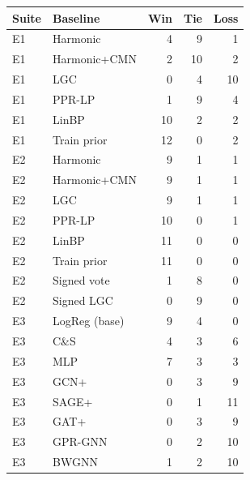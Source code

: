 \begin{tabular}{llrrr}
\toprule
Suite & Baseline & Win & Tie & Loss \\
\midrule
E1 & Harmonic & 4 & 9 & 1 \\
E1 & Harmonic+CMN & 2 & 10 & 2 \\
E1 & LGC & 0 & 4 & 10 \\
E1 & PPR-LP & 1 & 9 & 4 \\
E1 & LinBP & 10 & 2 & 2 \\
E1 & Train prior & 12 & 0 & 2 \\
E2 & Harmonic & 9 & 1 & 1 \\
E2 & Harmonic+CMN & 9 & 1 & 1 \\
E2 & LGC & 9 & 1 & 1 \\
E2 & PPR-LP & 10 & 0 & 1 \\
E2 & LinBP & 11 & 0 & 0 \\
E2 & Train prior & 11 & 0 & 0 \\
E2 & Signed vote & 1 & 8 & 0 \\
E2 & Signed LGC & 0 & 9 & 0 \\
E3 & LogReg (base) & 9 & 4 & 0 \\
E3 & C\&S & 4 & 3 & 6 \\
E3 & MLP & 7 & 3 & 3 \\
E3 & GCN+ & 0 & 3 & 9 \\
E3 & SAGE+ & 0 & 1 & 11 \\
E3 & GAT+ & 0 & 3 & 9 \\
E3 & GPR-GNN & 0 & 2 & 10 \\
E3 & BWGNN & 1 & 2 & 10 \\
\bottomrule
\end{tabular}
